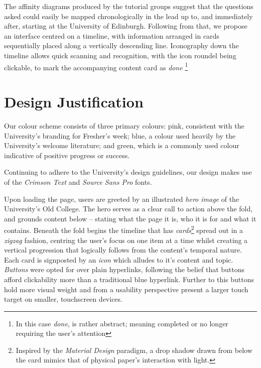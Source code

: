 \documentclass[a4paper, notoc]{tufte-handout}
\begin{document}
The affinity diagrams produced by the tutorial groups suggest that the questions asked could easily be mapped chronologically in the lead up to, and immediately after, starting at the University of Edinburgh. Following from that, we propose an interface centred on a timeline, with information arranged in cards sequentially placed along a vertically descending line. Iconography down the timeline allows quick scanning and recognition, with the icon roundel being clickable, to mark the accompanying content card as \textit{done}
\footnote{In this case \textit{done}, is rather abstract; meaning completed or no longer requiring the user's attention}


\section{Design Justification}\label{sec:design-justification}

Our colour scheme consists of three primary colours: pink, consistent with the University's branding for Fresher's week; blue, a colour used heavily by the University's welcome literature; and green, which is a commonly used colour indicative of positive progress or success.

Continuing to adhere to the University's design guidelines, our design makes use of the \textit{Crimson Text} and \textit{Source Sans Pro} fonts.

Upon loading the page, users are greeted by an illustrated \textit{hero image} of the University's Old College. The hero serves as a clear call to action above the fold, and grounds content below -- stating what the page it is, who it is for and what it contains. Beneath the fold begins the timeline that has \textit{cards}\footnote{Inspired by the \textit{Material Design} paradigm, a drop shadow drawn from below the card mimics that of physical paper's interaction with light.} spread out in a \textit{zigzag} fashion, centring the user's focus on one item at a time whilst creating a vertical progression that logically follows from the content's temporal nature. Each card is signposted by an \textit{icon} which alludes to it's content and topic. \textit{Buttons} were opted for over plain hyperlinks, following the belief that buttons afford clickability more than a traditional blue hyperlink. Further to this buttons hold more visual weight and from a usability perspective present a larger touch target on smaller, touchscreen devices.

\end{document}
